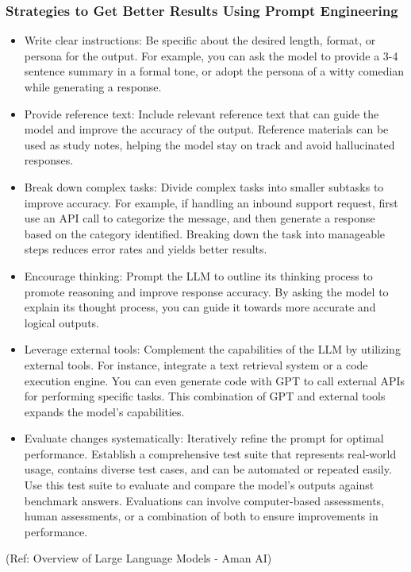 \begin{frame}[fragile]\frametitle{Strategies to Get Better Results Using Prompt Engineering}

\begin{itemize}
\item Write clear instructions: Be specific about the desired length, format, or persona for the output. For example, you can ask the model to provide a 3-4 sentence summary in a formal tone, or adopt the persona of a witty comedian while generating a response.
\item Provide reference text: Include relevant reference text that can guide the model and improve the accuracy of the output. Reference materials can be used as study notes, helping the model stay on track and avoid hallucinated responses.
\item Break down complex tasks: Divide complex tasks into smaller subtasks to improve accuracy. For example, if handling an inbound support request, first use an API call to categorize the message, and then generate a response based on the category identified. Breaking down the task into manageable steps reduces error rates and yields better results.
\item Encourage thinking: Prompt the LLM to outline its thinking process to promote reasoning and improve response accuracy. By asking the model to explain its thought process, you can guide it towards more accurate and logical outputs.
\item Leverage external tools: Complement the capabilities of the LLM by utilizing external tools. For instance, integrate a text retrieval system or a code execution engine. You can even generate code with GPT to call external APIs for performing specific tasks. This combination of GPT and external tools expands the model's capabilities.
\item Evaluate changes systematically: Iteratively refine the prompt for optimal performance. Establish a comprehensive test suite that represents real-world usage, contains diverse test cases, and can be automated or repeated easily. Use this test suite to evaluate and compare the model's outputs against benchmark answers. Evaluations can involve computer-based assessments, human assessments, or a combination of both to ensure improvements in performance.
\end{itemize}

{\tiny (Ref: Overview of Large Language Models - Aman AI)}

\end{frame}
